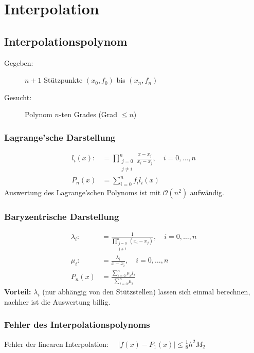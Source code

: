 \section{Interpolation} 
	\subsection{Interpolationspolynom} 
		\begin{description}
			\item[Gegeben:] $n+1$ Stützpunkte $(x_0,f_0)$ bis $(x_n,f_n)$
			\item[Gesucht:] Polynom $n$-ten Grades (Grad $\leq n$)
		\end{description}
		
		\subsubsection{Lagrange'sche Darstellung}
			\begin{align*}
				l_i(x) :&= \prod_{\substack{
					j=0 \\ j \neq i
				}}^n \frac{x-x_j}{x_i - x_j}, \quad i= 0, \dots, n \\
				P_n(x) &= \sum_{i=0}^{n}f_i l_i(x)
			\end{align*}
			Auswertung des Lagrange'schen Polynoms ist mit $\mathcal{O}(n^2)$ aufwändig.
			
		\subsubsection{Baryzentrische Darstellung}
			\begin{align*}
				\lambda_i :&= \frac{1}{\prod_{\substack{
					j=0 \\ j \neq i
				}}^n (x_i-x_j)}, \quad i= 0, \dots , n \\
				\mu_i :&= \frac{\lambda_i}{x-x_i},\quad i= 0, \dots , n \\
				P_n(x) &= \frac{\sum_{i=0}^n \mu_i f_i}{\sum_{i=0}^n \mu_i}
			\end{align*}
			\textbf{Vorteil:} $\lambda_i$ (nur abhängig von den Stützstellen) lassen sich einmal berechnen, nachher ist die Auswertung billig. 

		\subsubsection{Fehler des Interpolationspolynoms}
			Fehler der linearen Interpolation: $\displaystyle\quad |f(x) - P_1(x)| \leq \frac{1}{8}h^2M_2$
			
